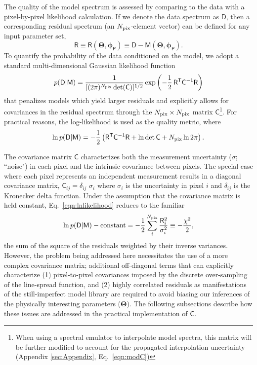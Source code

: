 \documentclass[iop,floatfix,numberedappendix,twocolappendix]{emulateapj}
\newcommand{\vM}{\mathsf{M}}
\newcommand{\vD}{\mathsf{D}}
\newcommand{\vR}{\mathsf{R}}
\newcommand{\vC}{\mathsf{C}}
\newcommand{\trans}{\mathsf{T}}
\newcommand{\vT}{ {\bm \Theta}}
\newcommand{\vp}{ {\bm \phi}}
\newcommand{\cheb}{ \vp_{\mathsf{P}}}
\begin{document}
The quality of the model spectrum is assessed by comparing to the data with a pixel-by-pixel 
likelihood calculation.  If we denote the data spectrum as $\vD$, then a corresponding residual 
spectrum (an $N_{\rm pix}$-element vector) can be defined for any input parameter set,
\begin{equation}
\vR \equiv \vR(\vT, \cheb) \equiv \vD-\vM(\vT, \cheb).
\end{equation}
To quantify the probability of the data conditioned on the model, we adopt a standard 
multi-dimensional Gaussian likelihood function
\begin{equation}
p(\vD|\vM) =  \frac{1}{[(2 \pi)^{N_{\rm pix}} \det(\vC)]^{1/2}} \exp\left ( -\frac{1}{2} \,
   \vR^\trans \vC^{-1} \vR \right )
   \label{eqn:likelihood}
\end{equation}
that penalizes models which yield larger residuals and explicitly allows for covariances in the
residual spectrum through the $N_{\rm pix} \times N_{\rm pix}$ matrix $\vC$\footnote{When using a
spectral emulator to interpolate model spectra, this matrix will be further modified to account
for the propagated interpolation uncertainty (Appendix \ref{sec:Appendix}, Eq.~\ref{eqn:modC})}.
For practical reasons, the log-likelihood is used as the quality metric, where
\begin{equation}
  \ln{p(\vD | \vM)} = -\frac{1}{2} \left( \vR^\trans \vC^{-1} \vR + \ln{\det{\vC}} + N_{\rm pix} \ln{2\pi} \right).
  \label{eqn:lnlikelihood}
\end{equation}

The covariance matrix $\vC$ characterizes both the measurement uncertainty ($\sigma$; ``noise") in 
each pixel and the intrinsic covariance between pixels.  The special case where each pixel 
represents an independent measurement results in a diagonal covariance matrix, $\vC_{ij} = 
\delta_{ij} \,\, \sigma_i$ where $\sigma_i$ is the uncertainty in pixel $i$ and $\delta_{ij}$ is 
the Kronecker delta function. Under the assumption that the covariance matrix is held constant, Eq.~\ref{eqn:lnlikelihood} reduces to the familiar
\begin{equation}
  \ln{p(\vD | \vM)} - \textrm{constant} = -\frac{1}{2} \sum_i^{N_{\rm pix}} \frac{\vR_i^2}{\sigma_i^2} \equiv -\frac{\chi^2}{2},
\label{eqn:chisq}
\end{equation}
the sum of the square of the residuals weighted by their inverse variances.  However, the problem 
being addressed here necessitates the use of a more complex covariance matrix; additional 
off-diagonal terms that can explicitly characterize (1) pixel-to-pixel covariances imposed by the 
discrete over-sampling of the line-spread function, and (2) highly correlated residuals as 
manifestations of the still-imperfect model library are required to avoid biasing our inferences of 
the physically interesting parameters ($\vT$).  The following subsections describe how these issues 
are addressed in the practical implementation of $\vC$.  
\end{document}

